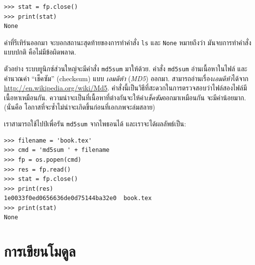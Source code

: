 \begin{verbatim}
>>> stat = fp.close()
>>> print(stat)
None
\end{verbatim}
%
%
ค่าที่รีเทิร์นออกมา จะบอกสถานะสุดท้ายของการทำคำสั่ง \texttt{ls}
และ \texttt{None} หมายถึงว่า มันจบการทำคำสั่งแบบปกติ คือไม่มีข้อผิดพลาด.


ตัวอย่าง ระบบยูนิกซ์ส่วนใหญ่จะมีคำสั่ง \texttt{md5sum} มาให้ด้วย.
คำสั่ง \texttt{md5sum} อ่านเนื้อหาในไฟล์ และคำนวณค่า ``เช็คซัม'' (checksum) แบบ \textit{เอมดีห้า} (\textit{MD5}) ออกมา.
สามารถอ่านเรื่อง\textit{เอมดีห้า}ได้จาก \url{http://en.wikipedia.org/wiki/Md5}. 
คำสั่งนี้เป็นวิธีที่สะดวกในการตรวจสอบว่าไฟล์สองไฟล์มีเนื้อหาเหมือนกัน.
ความน่าจะเป็นที่เนื้อหาที่ต่างกันจะให้ค่า\textit{เช็คซัม}ออกมาเหมือนกัน จะมีค่าน้อยมาก.
(นั่นคือ โอกาสที่จะซ้ำไม่น่าจะเกิดขึ้นก่อนที่เอกภพจะล่มสลาย)

%
เราสามารถใช้ไปป์เพื่อรัน \texttt{md5sum} จากไพธอนได้
และเราจะได้ผลลัพธ์เป็น:

\begin{verbatim}
>>> filename = 'book.tex'
>>> cmd = 'md5sum ' + filename
>>> fp = os.popen(cmd)
>>> res = fp.read()
>>> stat = fp.close()
>>> print(res)
1e0033f0ed0656636de0d75144ba32e0  book.tex
>>> print(stat)
None
\end{verbatim}



\section{การเขียนโมดูล}
\label{modules}


